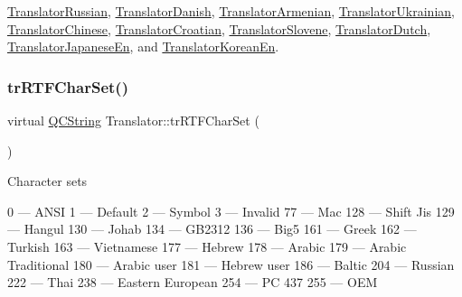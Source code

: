 \mbox{\hyperlink{class_translator_russian_aa913c332e155b0972fce4645cfd97b10}{Translator\+Russian}}, \mbox{\hyperlink{class_translator_danish_a95baec5866d6291c86fd305c78d61dfe}{Translator\+Danish}}, \mbox{\hyperlink{class_translator_armenian_ae1bc9124d188c8a6b6c0fafdadf51da1}{Translator\+Armenian}}, \mbox{\hyperlink{class_translator_ukrainian_a1c1ac485f5a2e6ef35b432925580cb13}{Translator\+Ukrainian}}, \mbox{\hyperlink{class_translator_chinese_a4f6b051cede382e7d4234506aeaccedb}{Translator\+Chinese}}, \mbox{\hyperlink{class_translator_croatian_ac17499fef00a33227b0b863cb3794ffa}{Translator\+Croatian}}, \mbox{\hyperlink{class_translator_slovene_a381c8c7ad7fe0ea5379e1ed062ba0905}{Translator\+Slovene}}, \mbox{\hyperlink{class_translator_dutch_ae0b6e77d800b7a57e9b17f689fb81771}{Translator\+Dutch}}, \mbox{\hyperlink{class_translator_japanese_en_a4da6df8b58582eb97ffef9f75e070c0f}{Translator\+Japanese\+En}}, and \mbox{\hyperlink{class_translator_korean_en_ac60d57743cc1cd0a7b6bc6c57a445b7e}{Translator\+Korean\+En}}.

\mbox{\label{class_translator_afad391f3cbfb5ce6332b7239f8e2049a}} 
\subsubsection{\texorpdfstring{trRTFCharSet()}{trRTFCharSet()}}
{\footnotesize\ttfamily virtual \mbox{\hyperlink{class_q_c_string}{Q\+C\+String}} Translator\+::tr\+R\+T\+F\+Char\+Set (\begin{DoxyParamCaption}{ }\end{DoxyParamCaption})\hspace{0.3cm}{\ttfamily [pure virtual]}}

Character sets 
\begin{DoxyPre}
  0 — ANSI
  1 — Default
  2 — Symbol
  3 — Invalid
 77 — Mac
128 — Shift Jis
129 — Hangul
130 — Johab
134 — GB2312
136 — Big5
161 — Greek
162 — Turkish
163 — Vietnamese
177 — Hebrew
178 — Arabic
179 — Arabic Traditional
180 — Arabic user
181 — Hebrew user
186 — Baltic
204 — Russian
222 — Thai
238 — Eastern European
254 — PC 437
255 — OEM
\end{DoxyPre}
 

